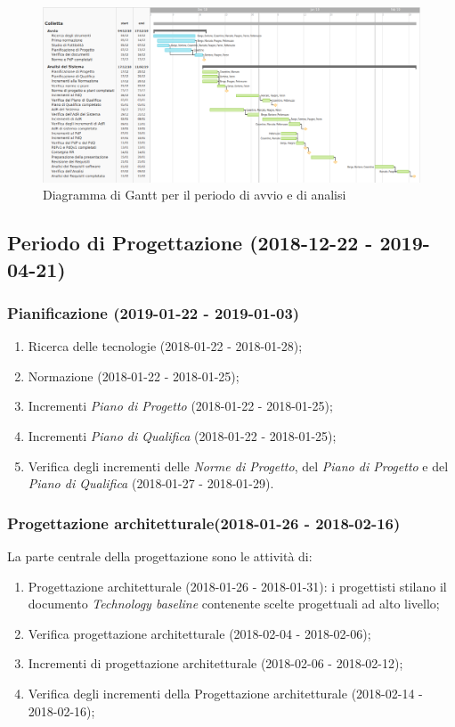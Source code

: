 	\newpage
	\begin{figure}[!hbtp]
		\centering
		\includegraphics[scale=0.5,angle=90]{images/ganttan.png}
		\caption{Diagramma di Gantt per il periodo di avvio e di analisi}
	\end{figure}

	\newpage
	\subsection{Periodo di Progettazione (2018-12-22 - 2019-04-21)}	
		\subsubsection{Pianificazione (2019-01-22 - 2019-01-03)\\} 
			\begin{enumerate}[label = 3.1.\arabic*)]
				\item Ricerca delle tecnologie (2018-01-22 - 2018-01-28);
				\item Normazione (2018-01-22 - 2018-01-25);
				\item Incrementi \textit{Piano di Progetto} (2018-01-22 - 2018-01-25);
				\item Incrementi \textit{Piano di Qualifica} (2018-01-22 - 2018-01-25);
				\item Verifica degli incrementi delle \textit{Norme di Progetto}, del \textit{Piano di Progetto} e del \textit{Piano di Qualifica} (2018-01-27 - 2018-01-29).
			\end{enumerate}
	
		\subsubsection{Progettazione architetturale(2018-01-26 - 2018-02-16)\\} La parte centrale della progettazione sono le attività di:
			\begin{enumerate}[label = 3.2.\arabic*)]
				\item Progettazione architetturale (2018-01-26 - 2018-01-31): i progettisti stilano il documento \textit{Technology baseline} contenente scelte progettuali ad alto livello;
				\item Verifica progettazione architetturale (2018-02-04 - 2018-02-06);
				\item Incrementi di progettazione architetturale (2018-02-06 - 2018-02-12);
				\item Verifica degli incrementi della Progettazione architetturale (2018-02-14 - 2018-02-16);
			\end{enumerate}

